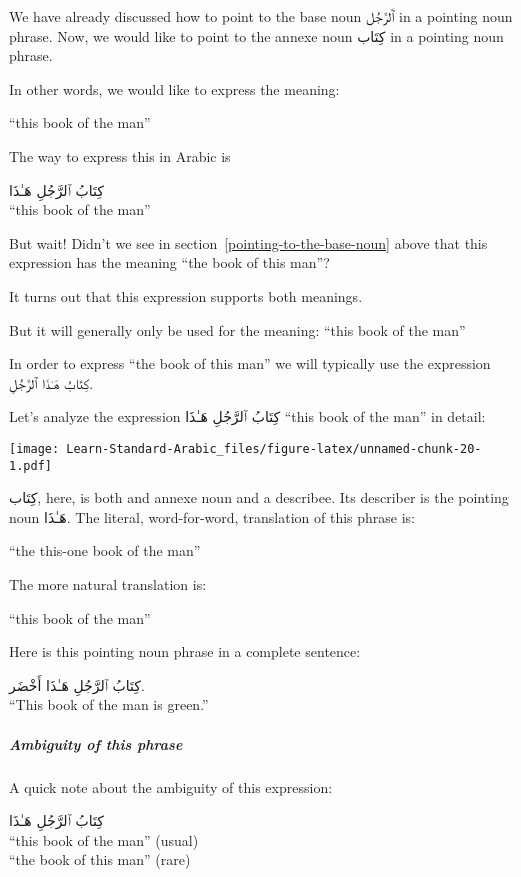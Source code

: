 \documentclass[
  10pt,
]{book}
\begin{document}
We have already discussed how to point to the base noun
\foreignlanguage{arabic}{ٱَلرَّجُل}
in a pointing noun phrase.
Now, we would like to point to the annexe noun
\foreignlanguage{arabic}{کِتَاب}
in a pointing noun phrase.

In other words, we would like to express the meaning:

\enquote{this book of the man}

The way to express this in Arabic is

\foreignlanguage{arabic}{کِتَابُ ٱلرَّجُلِ هَـٰذَا}\\
\enquote{this book of the man}

But wait! Didn't we see in section~\ref{pointing-to-the-base-noun} above that this expression has the meaning
\enquote{the book of this man}?

It turns out that this expression supports both meanings.

But it will generally only be used for the meaning: \enquote{this book of the man}

In order to express
\enquote{the book of this man}
we will typically use the expression \foreignlanguage{arabic}{کِتَابُ هَـٰذَا ٱلرَّجُلِ}.

Let's analyze the expression
\foreignlanguage{arabic}{کِتَابُ ٱلرَّجُلِ هَـٰذَا}
\enquote{this book of the man}
in detail:

\texttt{[image: Learn-Standard-Arabic\_files/figure-latex/unnamed-chunk-20-1.pdf]}

\foreignlanguage{arabic}{کِتَاب}, here, is both and annexe noun and a describee.
Its describer is the pointing noun
\foreignlanguage{arabic}{هَـٰذَا}.
The literal, word-for-word, translation of this phrase is:

\enquote{the this-one book of the man}

The more natural translation is:

\enquote{this book of the man}

Here is this pointing noun phrase in a complete sentence:

\foreignlanguage{arabic}{کِتَابُ ٱلرَّجُلِ هَـٰذَا أَخْضَر.}\\
\enquote{This book of the man is green.}

\subparagraph*{Ambiguity of this phrase}\label{ambiguity-of-this-phrase}

A quick note about the ambiguity of this expression:

\foreignlanguage{arabic}{کِتَابُ ٱلرَّجُلِ هَـٰذَا}\\
\enquote{this book of the man} (usual)\\
\enquote{the book of this man} (rare)
\end{document}
